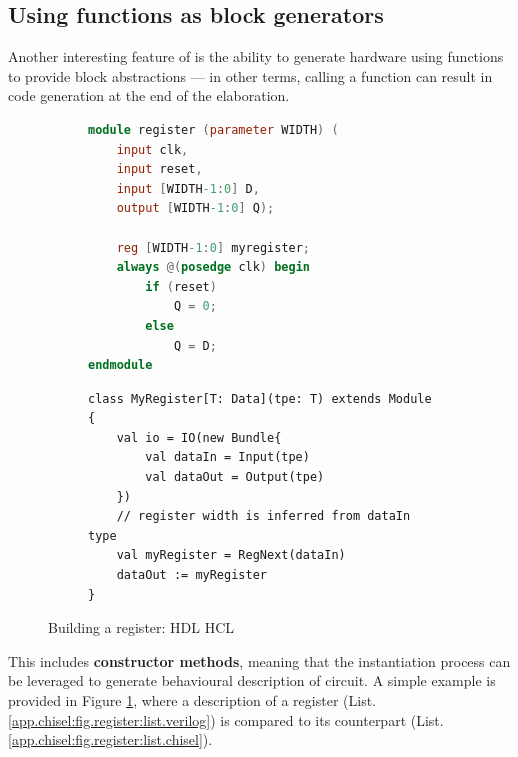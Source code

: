         \subsection*{Using functions as block generators}
            Another interesting feature of \chisel{} is the ability to generate hardware using functions to provide block abstractions --- in other terms, calling a function can result in  code generation at the end of the elaboration.

            \begin{figure}[h!]
                \vspace{-0.85cm}
                \begin{subfigure}{1.0\textwidth}
                    \begin{lstlisting}[language=Verilog,
                                       caption={Behavioural description of a register in Verilog},
                                       label={app.chisel:fig.register:list.verilog}]
module register (parameter WIDTH) (
    input clk,
    input reset,
    input [WIDTH-1:0] D,
    output [WIDTH-1:0] Q);

    reg [WIDTH-1:0] myregister;
    always @(posedge clk) begin
        if (reset)
            Q = 0;
        else
            Q = D;
endmodule\end{lstlisting}
                \end{subfigure}
                \begin{subfigure}{1.0\textwidth}
                    \begin{lstlisting}[caption={Building a register using \chiselT{} constructs},
                                       label={app.chisel:fig.register:list.chisel}]
class MyRegister[T: Data](tpe: T) extends Module {
    val io = IO(new Bundle{
        val dataIn = Input(tpe)
        val dataOut = Output(tpe)
    })
    // register width is inferred from dataIn type
    val myRegister = RegNext(dataIn)
    dataOut := myRegister
}\end{lstlisting}
                \end{subfigure}
                \caption{Building a register: HDL \vs{} HCL}
                \label{app.chisel:fig.register}
                \vspace{-0.55cm}
            \end{figure}

            This includes {\bf constructor methods}, meaning that the instantiation process can be leveraged to generate behavioural description of circuit.
            A simple example is provided in Figure \ref{app.chisel:fig.register}, where a \verilog{} description of a register (List. \ref{app.chisel:fig.register:list.verilog}) is compared to its \chisel{} counterpart (List. \ref{app.chisel:fig.register:list.chisel}).

